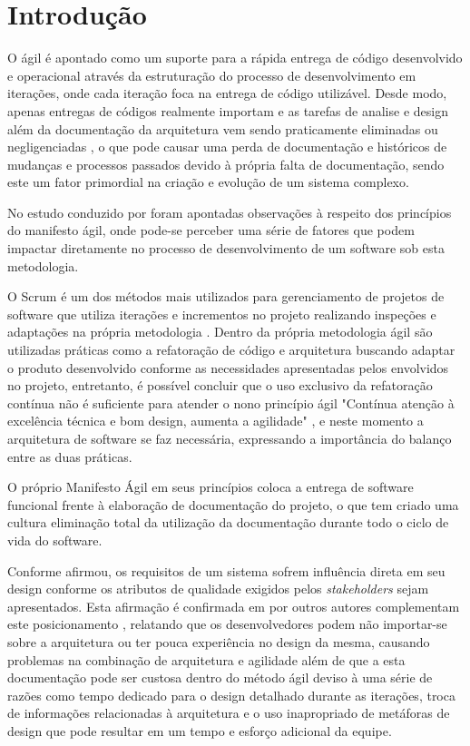 \chapter{Introdução}


O ágil é apontado como um suporte para a rápida entrega de código desenvolvido e operacional através da estruturação do processo de desenvolvimento em iterações, onde cada iteração foca na entrega de código utilizável. Desde modo, apenas entregas de códigos realmente importam e as tarefas de analise e design além da documentação da arquitetura vem sendo praticamente eliminadas ou negligenciadas \cite{waterman2015much}, o que pode causar uma perda de documentação e históricos de mudanças e processos passados devido à própria falta de documentação, sendo este um fator primordial na criação e evolução de um sistema complexo.

No estudo conduzido por \cite{waterman2015much} foram apontadas observações à respeito dos princípios do manifesto ágil, onde pode-se perceber uma série de fatores que podem impactar diretamente no processo de desenvolvimento de um software sob esta metodologia.

O Scrum é um dos métodos mais utilizados para gerenciamento de projetos de software que utiliza iterações e incrementos no projeto realizando inspeções e adaptações na própria metodologia \cite{babar2013agile}. Dentro da própria metodologia ágil são utilizadas práticas como a refatoração de código e arquitetura buscando adaptar o produto desenvolvido conforme as necessidades apresentadas pelos envolvidos no projeto, entretanto, é possível concluir que o uso exclusivo da refatoração contínua não é suficiente para atender o nono princípio ágil "Contínua atenção à excelência técnica e bom design, aumenta a agilidade" \cite{beck2001manifesto}, e neste momento a arquitetura de software se faz necessária, expressando a importância do balanço entre as duas práticas.

O próprio Manifesto Ágil \cite{manifestoagil} em seus princípios coloca a entrega de software funcional frente à elaboração de documentação do projeto, o que tem criado uma cultura eliminação total da utilização da documentação durante todo o ciclo de vida do software.

Conforme \cite{bass2007software} afirmou, os requisitos de um sistema sofrem influência direta em seu design conforme os atributos de qualidade exigidos pelos \textit{stakeholders} sejam apresentados. Esta afirmação é confirmada em por outros autores complementam este posicionamento \cite{prause2012architectural}, relatando que os desenvolvedores podem não importar-se sobre a arquitetura ou ter pouca experiência no design da mesma, causando problemas na combinação de arquitetura e agilidade além de que a esta documentação pode ser custosa dentro do método ágil deviso à uma série de razões como tempo dedicado para o design detalhado durante as iterações, troca de informações relacionadas à arquitetura e o uso inapropriado de metáforas de design que pode resultar em um tempo e esforço adicional da equipe.

